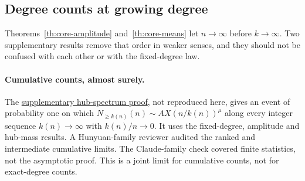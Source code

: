 \documentclass[11pt]{article}
\newcommand{\proofsrc}[2]{\href{https://github.com/uzay-eth/friend-tree-exponent/blob/a0972085ad72ad5685ae7b424988648d1965e73c/#1}{#2}}
\theoremstyle{remark}
\numberwithin{equation}{section}
\begin{document}
\subsection{Degree counts at growing degree}\label{sec:further-degrees}
Theorems~\ref{th:core-amplitude} and~\ref{th:core-means} let $n\to\infty$ before $k\to\infty$. Two supplementary results remove that order in weaker senses, and they should not be confused with each other or with the fixed-degree law.

\paragraph{Cumulative counts, almost surely.} The \proofsrc{round2/proofs/astra/source/round2/fringe/hub-spectrum.md}{supplementary hub-spectrum proof}, not reproduced here, gives an event of probability one on which $N_{\ge k(n)}(n)\sim AX(n/k(n))^\mu$ along every integer sequence $k(n)\to\infty$ with $k(n)/n\to0$. It uses the fixed-degree, amplitude and hub-mass results. A Hunyuan-family reviewer audited the ranked and intermediate cumulative limits. The Claude-family check covered finite statistics, not the asymptotic proof. This is a joint limit for cumulative counts, not for exact-degree counts.
\end{document}
